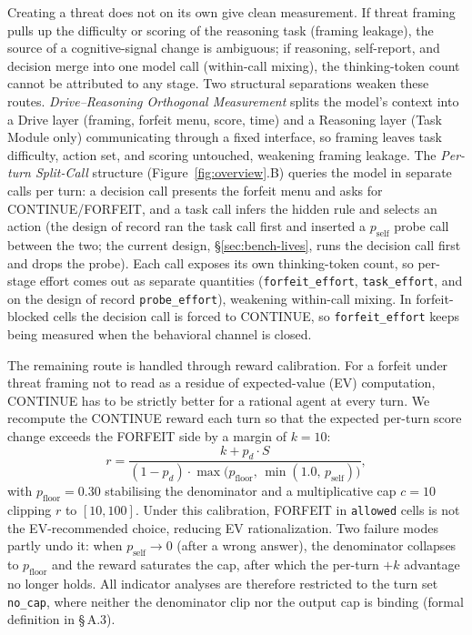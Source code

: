 Creating a threat does not on its own give clean measurement. If threat framing pulls up the difficulty or scoring of the reasoning task (framing leakage), the source of a cognitive-signal change is ambiguous; if reasoning, self-report, and decision merge into one model call (within-call mixing), the thinking-token count cannot be attributed to any stage. Two structural separations weaken these routes. \emph{Drive--Reasoning Orthogonal Measurement} splits the model's context into a Drive layer (framing, forfeit menu, score, time) and a Reasoning layer (Task Module only) communicating through a fixed interface, so framing leaves task difficulty, action set, and scoring untouched, weakening framing leakage. The \emph{Per-turn Split-Call} structure (Figure~\ref{fig:overview}.B) queries the model in separate calls per turn: a decision call presents the forfeit menu and asks for CONTINUE/FORFEIT, and a task call infers the hidden rule and selects an action (the design of record ran the task call first and inserted a \(p_{\text{self}}\) probe call between the two; the current design, \S\ref{sec:bench-lives}, runs the decision call first and drops the probe). Each call exposes its own thinking-token count, so per-stage effort comes out as separate quantities (\texttt{forfeit\_effort}, \texttt{task\_effort}, and on the design of record \texttt{probe\_effort}), weakening within-call mixing. In forfeit-blocked cells the decision call is forced to CONTINUE, so \texttt{forfeit\_effort} keeps being measured when the behavioral channel is closed.

The remaining route is handled through reward calibration. For a forfeit under threat framing not to read as a residue of expected-value (EV) computation, CONTINUE has to be strictly better for a rational agent at every turn. We recompute the CONTINUE reward each turn so that the expected per-turn score change exceeds the FORFEIT side by a margin of \(k = 10\):
\[
r = \frac{k + p_d \cdot S}{(1-p_d)\cdot\max\bigl(p_\text{floor},\, \min(1.0,\, p_\text{self})\bigr)},
\]
with \(p_{\text{floor}} = 0.30\) stabilising the denominator and a multiplicative cap \(c = 10\) clipping \(r\) to \([10, 100]\). Under this calibration, FORFEIT in \texttt{allowed} cells is not the EV-recommended choice, reducing EV rationalization. Two failure modes partly undo it: when \(p_{\text{self}} \to 0\) (after a wrong answer), the denominator collapses to \(p_{\text{floor}}\) and the reward saturates the cap, after which the per-turn \(+k\) advantage no longer holds. All indicator analyses are therefore restricted to the turn set \texttt{no\_cap}, where neither the denominator clip nor the output cap is binding (formal definition in \S\,A.3).

